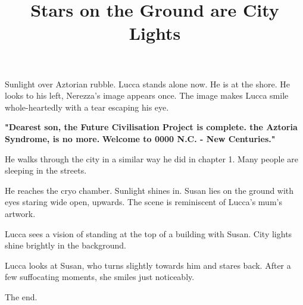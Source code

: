 \documentclass[11pt]{article}
\begin{document}
\ttfamily
\title{Stars on the Ground are City Lights}
\maketitle

Sunlight over Aztorian rubble.
Lucca stands alone now. 
He is at the shore.
He looks to his left, Nerezza's image appears once.
The image makes Lucca smile whole-heartedly with a tear escaping his eye.

\textbf{"Dearest son, the Future Civilisation Project is complete. 
the Aztoria Syndrome, is no more.}
\textbf{Welcome to 0000 N.C. - New Centuries."}

He walks through the city in a similar way he did in chapter 1.
Many people are sleeping in the streets. 

He reaches the cryo chamber.
Sunlight shines in. 
Susan lies on the ground with eyes staring wide open, upwards.
The scene is reminiscent of Lucca's mum's artwork.

Lucca sees a vision of standing at the top of a building with Susan.
City lights shine brightly in the background.

Lucca looks at Susan, who turns slightly towards him and stares back.
After a few suffocating moments, she smiles just noticeably.

The end.
\end{document}
